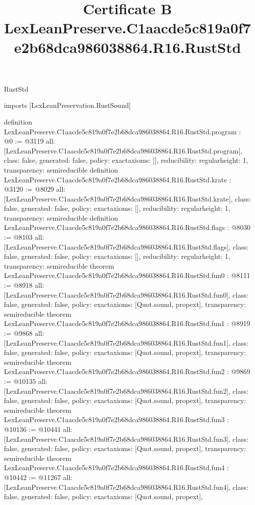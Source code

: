 \begin{lexlean}{RustStd}
\title{Certificate B LexLeanPreserve.C1aacde5c819a0f7e2b68dca986038864.R16.RustStd}
\begin{coremodule}
imports [LexLeanPreservation.RustSound]

definition LexLeanPreserve.C1aacde5c819a0f7e2b68dca986038864.R16.RustStd.program : @0 := @3119 {
  all: [LexLeanPreserve.C1aacde5c819a0f7e2b68dca986038864.R16.RustStd.program],
  class: false,
  generated: false,
  policy: exact{axioms: []},
  reducibility: regular{height: 1},
  transparency: semireducible
}
definition LexLeanPreserve.C1aacde5c819a0f7e2b68dca986038864.R16.RustStd.krate : @3120 := @8029 {
  all: [LexLeanPreserve.C1aacde5c819a0f7e2b68dca986038864.R16.RustStd.krate],
  class: false,
  generated: false,
  policy: exact{axioms: []},
  reducibility: regular{height: 1},
  transparency: semireducible
}
definition LexLeanPreserve.C1aacde5c819a0f7e2b68dca986038864.R16.RustStd.flags : @8030 := @8103 {
  all: [LexLeanPreserve.C1aacde5c819a0f7e2b68dca986038864.R16.RustStd.flags],
  class: false,
  generated: false,
  policy: exact{axioms: []},
  reducibility: regular{height: 1},
  transparency: semireducible
}
theorem LexLeanPreserve.C1aacde5c819a0f7e2b68dca986038864.R16.RustStd.fun0 : @8111 := @8918 {
  all: [LexLeanPreserve.C1aacde5c819a0f7e2b68dca986038864.R16.RustStd.fun0],
  class: false,
  generated: false,
  policy: exact{axioms: [Quot.sound, propext]},
  transparency: semireducible
}
theorem LexLeanPreserve.C1aacde5c819a0f7e2b68dca986038864.R16.RustStd.fun1 : @8919 := @9868 {
  all: [LexLeanPreserve.C1aacde5c819a0f7e2b68dca986038864.R16.RustStd.fun1],
  class: false,
  generated: false,
  policy: exact{axioms: [Quot.sound, propext]},
  transparency: semireducible
}
theorem LexLeanPreserve.C1aacde5c819a0f7e2b68dca986038864.R16.RustStd.fun2 : @9869 := @10135 {
  all: [LexLeanPreserve.C1aacde5c819a0f7e2b68dca986038864.R16.RustStd.fun2],
  class: false,
  generated: false,
  policy: exact{axioms: [Quot.sound, propext]},
  transparency: semireducible
}
theorem LexLeanPreserve.C1aacde5c819a0f7e2b68dca986038864.R16.RustStd.fun3 : @10136 := @10441 {
  all: [LexLeanPreserve.C1aacde5c819a0f7e2b68dca986038864.R16.RustStd.fun3],
  class: false,
  generated: false,
  policy: exact{axioms: [Quot.sound, propext]},
  transparency: semireducible
}
theorem LexLeanPreserve.C1aacde5c819a0f7e2b68dca986038864.R16.RustStd.fun4 : @10442 := @11267 {
  all: [LexLeanPreserve.C1aacde5c819a0f7e2b68dca986038864.R16.RustStd.fun4],
  class: false,
  generated: false,
  policy: exact{axioms: [Quot.sound, propext]},
}
\end{coremodule}
\end{lexlean}
